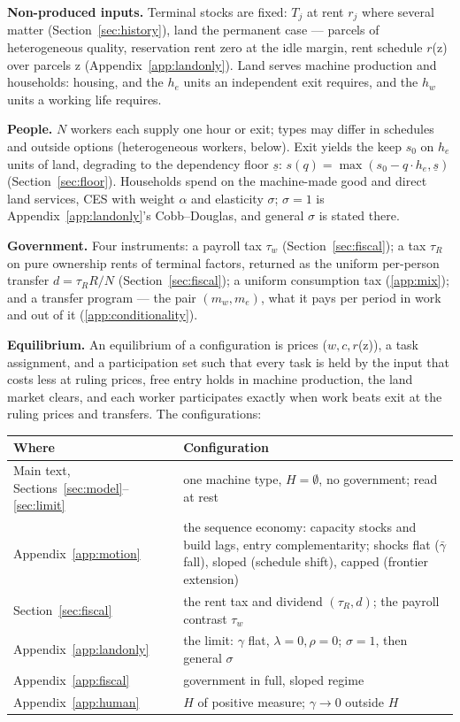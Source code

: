 \documentclass[12pt]{article}
\theoremstyle{plain}
\begin{document}
\textbf{Non-produced inputs.} Terminal stocks are fixed: $T_j$ at rent $r_j$ where several matter (Section~\ref{sec:history}), land the permanent case --- parcels of heterogeneous quality, reservation rent zero at the idle margin, rent schedule $r$(z) over parcels z (Appendix~\ref{app:landonly}). Land serves machine production and households: housing, and the $h_e$ units an independent exit requires, and the $h_w$ units a working life requires.

\textbf{People.} $N$ workers each supply one hour or exit; types may differ in schedules and outside options (heterogeneous workers, below). Exit yields the keep $s_0$ on $h_e$ units of land, degrading to the dependency floor $\underline{s}$: $s(q) = \max(s_0 - q\cdot h_e, \underline{s})$ (Section~\ref{sec:floor}). Households spend on the machine-made good and direct land services, CES with weight $\alpha$ and elasticity $\sigma$; $\sigma = 1$ is Appendix~\ref{app:landonly}'s Cobb--Douglas, and general $\sigma$ is stated there.

\textbf{Government.} Four instruments: a payroll tax $\tau _w$ (Section~\ref{sec:fiscal}); a tax $\tau _R$ on pure ownership rents of terminal factors, returned as the uniform per-person transfer $d = \tau _R R/N$ (Section~\ref{sec:fiscal}); a uniform consumption tax (\ref{app:mix}); and a transfer program --- the pair $(m_w, m_e)$, what it pays per period in work and out of it (\ref{app:conditionality}).

\textbf{Equilibrium.} An equilibrium of a configuration is prices ($w, c, r$(z)), a task assignment, and a participation set such that every task is held by the input that costs less at ruling prices, free entry holds in machine production, the land market clears, and each worker participates exactly when work beats exit at the ruling prices and transfers. The configurations:

\begin{center}
{\small
\begin{tabular}{l p{8.6cm}}
\toprule
Where & Configuration \\
\midrule
Main text, Sections~\ref{sec:model}--\ref{sec:limit} & one machine type, $H = \emptyset$, no government; read at rest \\
Appendix~\ref{app:motion} & the sequence economy: capacity stocks and build lags, entry complementarity; shocks flat ($\bar{\gamma}$ fall), sloped (schedule shift), capped (frontier extension) \\
Section~\ref{sec:fiscal} & the rent tax and dividend $(\tau _R, d)$; the payroll contrast $\tau _w$ \\
Appendix~\ref{app:landonly} & the limit: $\gamma$ flat, $\lambda = 0, \rho = 0$; $\sigma = 1$, then general $\sigma$ \\
Appendix~\ref{app:fiscal} & government in full, sloped regime \\
Appendix~\ref{app:human} & $H$ of positive measure; $\gamma \to 0$ outside $H$ \\
\bottomrule
\end{tabular}
}
\end{center}
\end{document}
